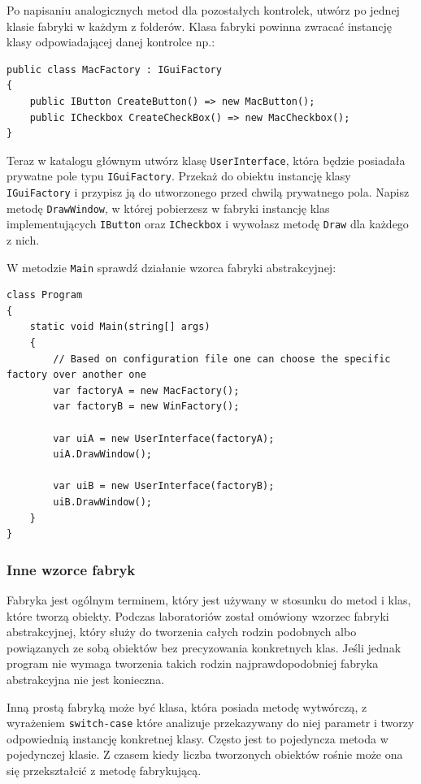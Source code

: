
Po napisaniu analogicznych metod dla pozostałych kontrolek, utwórz po jednej klasie fabryki w każdym z folderów. Klasa fabryki powinna zwracać instancję klasy odpowiadającej danej kontrolce np.:
\begin{lstlisting}
public class MacFactory : IGuiFactory
{
	public IButton CreateButton() => new MacButton();
	public ICheckbox CreateCheckBox() => new MacCheckbox();
}
\end{lstlisting}


Teraz w katalogu głównym utwórz klasę \texttt{UserInterface}, która będzie posiadała prywatne pole typu \texttt{IGuiFactory}. Przekaż do obiektu instancję klasy \texttt{IGuiFactory} i przypisz ją do utworzonego przed chwilą prywatnego pola. Napisz metodę \texttt{DrawWindow}, w której pobierzesz w fabryki instancję klas implementujących \texttt{IButton} oraz \texttt{ICheckbox} i wywołasz metodę \texttt{Draw} dla każdego z nich.

W metodzie \texttt{Main} sprawdź działanie wzorca fabryki abstrakcyjnej:
\begin{lstlisting}
class Program
{
	static void Main(string[] args)
	{
		// Based on configuration file one can choose the specific factory over another one
		var factoryA = new MacFactory();
		var factoryB = new WinFactory();
		
		var uiA = new UserInterface(factoryA);
		uiA.DrawWindow();
		
		var uiB = new UserInterface(factoryB);
		uiB.DrawWindow();
	}
}
\end{lstlisting}

\subsubsection{Inne wzorce fabryk}
Fabryka jest ogólnym terminem, który jest używany w stosunku do metod i klas, które tworzą obiekty. Podczas laboratoriów został omówiony wzorzec fabryki abstrakcyjnej, który służy do tworzenia całych rodzin podobnych albo powiązanych ze sobą obiektów bez precyzowania konkretnych klas. Jeśli jednak program nie wymaga tworzenia takich rodzin najprawdopodobniej fabryka abstrakcyjna nie jest konieczna. 

Inną prostą fabryką może być klasa, która posiada metodę wytwórczą, z wyrażeniem \texttt{switch-case} które analizuje przekazywany do niej parametr i tworzy odpowiednią instancję konkretnej klasy. Często jest to pojedyncza metoda w pojedynczej klasie. Z czasem kiedy liczba tworzonych obiektów rośnie może ona się przekształcić z metodę fabrykującą. 

